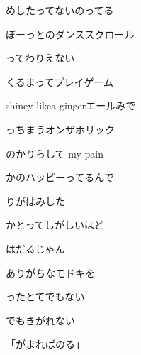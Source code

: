 \documentclass[a4paper,tate,twocolumn,12pt]{ltjtarticle}
\begin{document}
\thispagestyle{empty}

\begin{center}
{\LARGE {}}
\end{center}

\vspace{1em}

\begin{flushleft}

\noindent\begin{minipage}{\linewidth}
めしたってないのってる

ぼーっとのダンススクロール

ってわりえない

くるまってプレイゲーム
\end{minipage}

\vspace{2em}

\noindent\begin{minipage}{\linewidth}
shiney likea gingerエールみで

っちまうオンザホリック

のかりらして my pain

かのハッピーってるんで
\end{minipage}

\vspace{2em}

\noindent\begin{minipage}{\linewidth}
りがはみした

かとってしがしいほど

はだるじゃん

ありがちなモドキを

ったとてでもない

でもきがれない

「がまればのる」
\end{minipage}


\end{flushleft}
\end{document}
